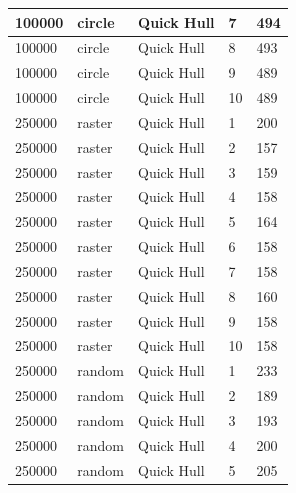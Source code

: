 \documentclass[12pt]{article}
\begin{document}
\begin{longtable}{|l|l|l|l|l|}
100000       & circle            & Quick Hull & 7          & 494                           \\ \hline
100000       & circle            & Quick Hull & 8          & 493                           \\ \hline
100000       & circle            & Quick Hull & 9          & 489                           \\ \hline
100000       & circle            & Quick Hull & 10         & 489                           \\ \hline
250000       & raster            & Quick Hull & 1          & 200                           \\ \hline
250000       & raster            & Quick Hull & 2          & 157                           \\ \hline
250000       & raster            & Quick Hull & 3          & 159                           \\ \hline
250000       & raster            & Quick Hull & 4          & 158                           \\ \hline
250000       & raster            & Quick Hull & 5          & 164                           \\ \hline
250000       & raster            & Quick Hull & 6          & 158                           \\ \hline
250000       & raster            & Quick Hull & 7          & 158                           \\ \hline
250000       & raster            & Quick Hull & 8          & 160                           \\ \hline
250000       & raster            & Quick Hull & 9          & 158                           \\ \hline
250000       & raster            & Quick Hull & 10         & 158                           \\ \hline
250000       & random            & Quick Hull & 1          & 233                           \\ \hline
250000       & random            & Quick Hull & 2          & 189                           \\ \hline
250000       & random            & Quick Hull & 3          & 193                           \\ \hline
250000       & random            & Quick Hull & 4          & 200                           \\ \hline
250000       & random            & Quick Hull & 5          & 205                           \\ \hline

\end{longtable}
\end{document}
